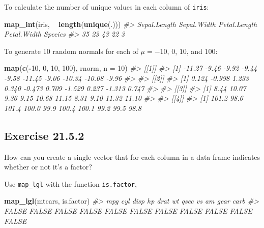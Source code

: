 \documentclass[]{book}
\newenvironment{Shaded}{\begin{snugshade}}{\end{snugshade}}
\newcommand{\CommentTok}[1]{\textcolor[rgb]{0.56,0.35,0.01}{\textit{#1}}}
\newcommand{\DataTypeTok}[1]{\textcolor[rgb]{0.13,0.29,0.53}{#1}}
\newcommand{\DecValTok}[1]{\textcolor[rgb]{0.00,0.00,0.81}{#1}}
\newcommand{\KeywordTok}[1]{\textcolor[rgb]{0.13,0.29,0.53}{\textbf{#1}}}
\newcommand{\NormalTok}[1]{#1}
\newcommand{\OperatorTok}[1]{\textcolor[rgb]{0.81,0.36,0.00}{\textbf{#1}}}
\newcommand{\StringTok}[1]{\textcolor[rgb]{0.31,0.60,0.02}{#1}}
\theoremstyle{plain}
\theoremstyle{remark}
\theoremstyle{definition}
\theoremstyle{definition}
\theoremstyle{definition}
\theoremstyle{remark}
\begin{document}
To calculate the number of unique values in each column of
\texttt{iris}:

\begin{Shaded}
\begin{Highlighting}[]
\KeywordTok{map_int}\NormalTok{(iris, }\OperatorTok{~}\StringTok{ }\KeywordTok{length}\NormalTok{(}\KeywordTok{unique}\NormalTok{(.)))}
\CommentTok{#> Sepal.Length  Sepal.Width Petal.Length  Petal.Width      Species }
\CommentTok{#>           35           23           43           22            3}
\end{Highlighting}
\end{Shaded}

To generate 10 random normals for each of \(\mu = -10\), \(0\), \(10\),
and \(100\):

\begin{Shaded}
\begin{Highlighting}[]
\KeywordTok{map}\NormalTok{(}\KeywordTok{c}\NormalTok{(}\OperatorTok{-}\DecValTok{10}\NormalTok{, }\DecValTok{0}\NormalTok{, }\DecValTok{10}\NormalTok{, }\DecValTok{100}\NormalTok{), rnorm, }\DataTypeTok{n =} \DecValTok{10}\NormalTok{)}
\CommentTok{#> [[1]]}
\CommentTok{#>  [1] -11.27  -9.46  -9.92  -9.44  -9.58 -11.45  -9.06 -10.34 -10.08  -9.96}
\CommentTok{#> }
\CommentTok{#> [[2]]}
\CommentTok{#>  [1]  0.124 -0.998  1.233  0.340 -0.473  0.709 -1.529  0.237 -1.313  0.747}
\CommentTok{#> }
\CommentTok{#> [[3]]}
\CommentTok{#>  [1]  8.44 10.07  9.36  9.15 10.68 11.15  8.31  9.10 11.32 11.10}
\CommentTok{#> }
\CommentTok{#> [[4]]}
\CommentTok{#>  [1] 101.2  98.6 101.4 100.0  99.9 100.4 100.1  99.2  99.5  98.8}
\end{Highlighting}
\end{Shaded}

\hypertarget{exercise-21.5.2}{%
\subsection*{\texorpdfstring{Exercise
{21.5.2}}{Exercise 21.5.2}}\label{exercise-21.5.2}}

How can you create a single vector that for each column in a data frame
indicates whether or not it's a factor?

Use \texttt{map\_lgl} with the function \texttt{is.factor},

\begin{Shaded}
\begin{Highlighting}[]
\KeywordTok{map_lgl}\NormalTok{(mtcars, is.factor)}
\CommentTok{#>   mpg   cyl  disp    hp  drat    wt  qsec    vs    am  gear  carb }
\CommentTok{#> FALSE FALSE FALSE FALSE FALSE FALSE FALSE FALSE FALSE FALSE FALSE}
\end{Highlighting}
\end{Shaded}
\end{document}
